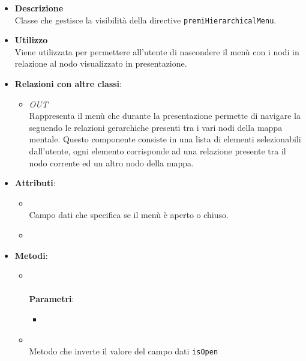 \begin{itemize}
\item \textbf{Descrizione}\\
Classe che gestisce la visibilità della directive \texttt{premiHierarchicalMenu}.
\item \textbf{Utilizzo}\\
Viene utilizzata per permettere all'utente di nascondere il menù con i nodi in relazione al nodo visualizzato in presentazione.
\item \textbf{Relazioni con altre classi}:
\begin{itemize}
\item \textit{OUT} \hyperref[\nogloxy{Premi::Front-End::Directives::premiHierarchicalMenu}]{}\\
Rappresenta il menù che durante la presentazione permette di navigare la  seguendo le relazioni gerarchiche presenti tra i vari nodi della mappa mentale. Questo componente consiste in una lista di elementi selezionabili dall’utente, ogni elemento corrisponde ad una relazione presente tra il nodo corrente ed un altro nodo della mappa.
\end{itemize}
\item \textbf{Attributi}:
\begin{itemize}
\item {}
\\ Campo dati che specifica se il menù è aperto o chiuso.
\item {}
\\ \dpScopeField
\end{itemize}
\item \textbf{Metodi}:
\begin{itemize}
\item {}
\\ \dpConstructor
\\ \textbf{Parametri}:
\begin{itemize}
\item {}
\\ \dpScopeParam
\end{itemize}
\item {}
\\ Metodo che inverte il valore del campo dati \texttt{isOpen}
\end{itemize}
\end{itemize}

